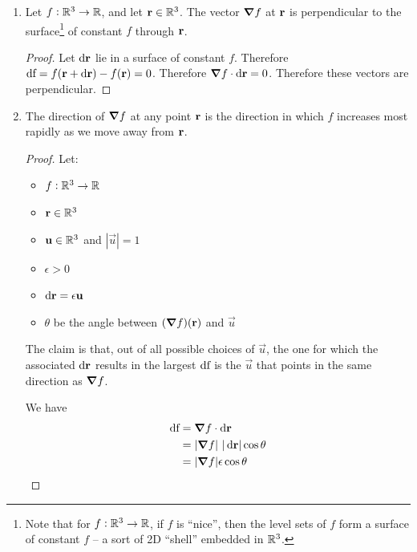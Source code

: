 \begin{enumerate}[label=(\alph*)]
\item
  \begin{claim*}
    Let $f:\mathbb{R}^3 \to \mathbb{R}$, and let $\mathbf{r} \in \mathbb{R}^3$. The vector $\grad f$ at $\mathbf{r}$ is perpendicular to the
    surface\footnote{Note that for $f:\mathbb{R}^3 \to \mathbb{R}$, if $f$ is ``nice'', then the level sets of $f$
      form a surface of constant $f$ -- a sort of 2D ``shell'' embedded in $\mathbb{R}^3$.} of constant $f$
    through $\mathbf{r}$.
  \end{claim*}
  \begin{proof}
    Let $\d\r$ lie in a surface of constant $f$. Therefore $\df = f(\r + \d\r) - f(\r) =
    0$. Therefore $\grad f \cdot \d\r = 0$. Therefore these vectors are perpendicular.
  \end{proof}
\item
  \begin{claim*}
    The direction of $\grad f$ at any point $\mathbf{r}$ is the direction in which $f$ increases most
    rapidly as we move away from $\mathbf{r}$.
  \end{claim*}
  \begin{proof}
    Let:
    \begin{itemize}
    \item $f:\mathbb{R}^3 \to \mathbb{R}$
    \item $\mathbf{r} \in \mathbb{R}^3$
    \item $\mathbf u \in \mathbb{R}^3$ and $|\vec u| = 1$
    \item $\epsilon > 0$
    \item $\d\r = \epsilon\vec u$
    \item $\theta$ be the angle between $(\grad f)(\mathbf{r})$ and $\vec u$
    \end{itemize}
    The claim is that, out of all possible choices of $\vec u$, the one for which the associated
    $\d\r$ results in the largest $\operatorname{\text{df}}$ is the $\vec u$ that points in the same direction as
    $\grad f$.

    We have
    \begin{align*}
      \df
      &= \grad f \cdot \d\r \\
      &= |\grad f| ~ |\d\r| \cos \theta \\
      &= |\grad f|\epsilon \cos \theta \\
    \end{align*}

  \end{proof}
\end{enumerate}

